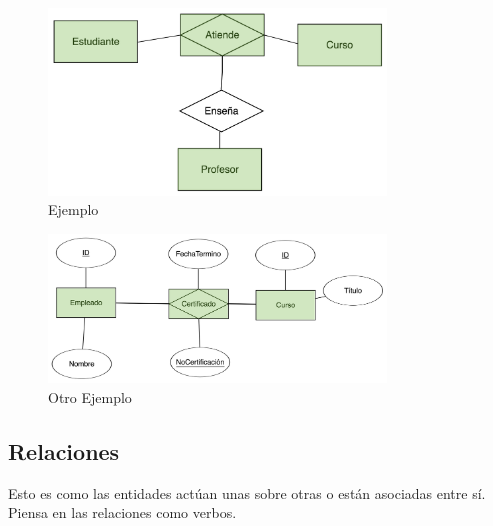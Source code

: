 \documentclass[12pt, fleqn]{report}                             %
\begin{document}
\begin{itemize}
                        \begin{figure}[h]
                            \centering
                            \includegraphics[width=0.80\textwidth]{EjemploEntidadAsociativa}
                            \caption{Ejemplo}
                        \end{figure}

                        \vspace{5em}

                        \begin{figure}[h]
                            \centering
                            \includegraphics[width=0.80\textwidth]{EjemploEntidadAsociativa2}
                            \caption{Otro Ejemplo}
                        \end{figure}
                \end{itemize}



            \clearpage
            \subsection{Relaciones}
                    
                Esto es como las entidades actúan unas sobre otras o están asociadas entre sí.
                Piensa en las relaciones como verbos.
\end{document}
